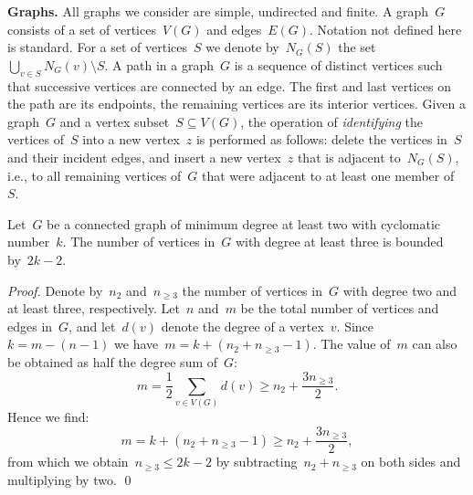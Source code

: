 \let\accentvec\vec  \documentclass{llncs}
\begin{document}
\textbf{Graphs.}
All graphs we consider are simple, undirected and finite. A graph~$G$ consists of a set of vertices~$V(G)$ and edges~$E(G)$. Notation not defined here is standard. For a set of vertices~$S$ we denote by~$N_G(S)$ the set~$\bigcup _{v \in S} N_G(v) \setminus S$. A path in a graph~$G$ is a sequence of distinct vertices such that successive vertices are connected by an edge. The first and last vertices on the path are its endpoints, the remaining vertices are its interior vertices. Given a graph~$G$ and a vertex subset~$S \subseteq V(G)$, the operation of \emph{identifying} the vertices of~$S$ into a new vertex~$z$ is performed as follows: delete the vertices in~$S$ and their incident edges, and insert a new vertex~$z$ that is adjacent to~$N_G(S)$, i.e., to all remaining vertices of~$G$ that were adjacent to at least one member of~$S$.

\begin{proposition} \label{proposition:degtwo}
Let~$G$ be a connected graph of minimum degree at least two with cyclomatic number~$k$. The number of vertices in~$G$ with degree at least three is bounded by~$2k-2$.
\end{proposition}
\begin{proof}
Denote by~$n_2$ and~$n_{\geq 3}$ the number of vertices in~$G$ with degree two and at least three, respectively. Let~$n$ and~$m$ be the total number of vertices and edges in~$G$, and let~$d(v)$ denote the degree of a vertex~$v$. Since~$k = m - (n-1)$ we have~$m = k + (n_2 + n_{\geq 3} - 1)$. The value of~$m$ can also be obtained as half the degree sum of~$G$:
$$m = \frac{1}{2} \sum_{v \in V(G)} d(v) \geq n_2 + \frac{3n_{\geq 3}}{2}.$$
Hence we find:
$$m = k + (n_2 + n_{\geq 3} - 1) \geq n_2 + \frac{3n_{\geq 3}}{2},$$ from which we obtain~$n_{\geq 3} \leq 2k-2$ by subtracting~$n_2 + n_{\geq 3}$ on both sides and multiplying by two.
\qed
\end{proof}
\end{document}
